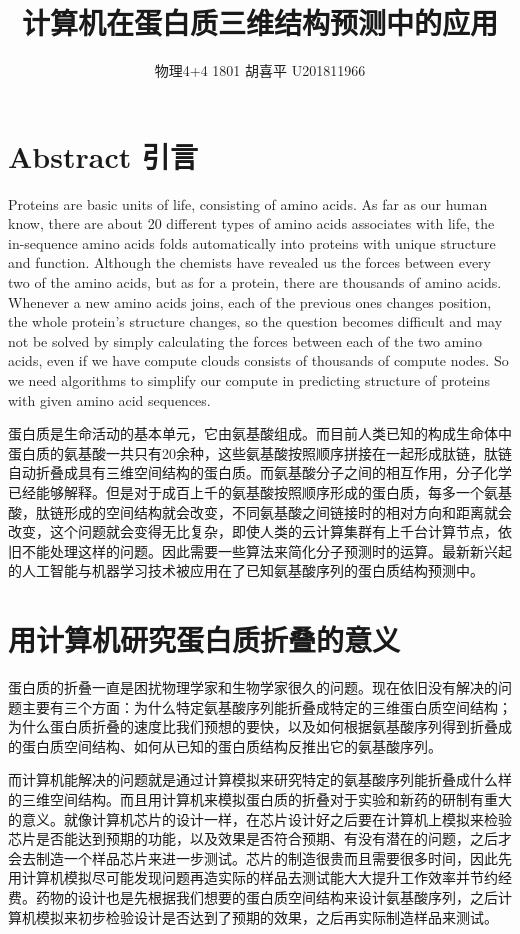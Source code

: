 \documentclass{article}
\author{物理4+4 1801 \quad 胡喜平 \quad U201811966}
\affil{https://hxp.plus/}
\title{计算机在蛋白质三维结构预测中的应用}
\begin{document}
\maketitle

\section{Abstract 引言}

Proteins are basic units of life, consisting of amino acids. As far as our human know, there are about 20 different types of amino acids associates with life, the in-sequence amino acids folds automatically into proteins with unique structure and function. Although the chemists have revealed us the forces between every two of the amino acids, but as for a protein, there are thousands of amino acids. Whenever a new amino acids joins, each of the previous ones changes position, the whole protein's structure changes, so the question becomes difficult and may not be solved by simply calculating the forces between each of the two amino acids, even if we have compute clouds consists of thousands of compute nodes. So we need algorithms to simplify our compute in predicting structure of proteins with given amino acid sequences.

蛋白质是生命活动的基本单元，它由氨基酸组成。而目前人类已知的构成生命体中蛋白质的氨基酸一共只有20余种，这些氨基酸按照顺序拼接在一起形成肽链，肽链自动折叠成具有三维空间结构的蛋白质。而氨基酸分子之间的相互作用，分子化学已经能够解释。但是对于成百上千的氨基酸按照顺序形成的蛋白质，每多一个氨基酸，肽链形成的空间结构就会改变，不同氨基酸之间链接时的相对方向和距离就会改变，这个问题就会变得无比复杂，即使人类的云计算集群有上千台计算节点，依旧不能处理这样的问题。因此需要一些算法来简化分子预测时的运算。最新新兴起的人工智能与机器学习技术被应用在了已知氨基酸序列的蛋白质结构预测中。

\section{用计算机研究蛋白质折叠的意义}

蛋白质的折叠一直是困扰物理学家和生物学家很久的问题。现在依旧没有解决的问题主要有三个方面：为什么特定氨基酸序列能折叠成特定的三维蛋白质空间结构；为什么蛋白质折叠的速度比我们预想的要快，以及如何根据氨基酸序列得到折叠成的蛋白质空间结构、如何从已知的蛋白质结构反推出它的氨基酸序列。

而计算机能解决的问题就是通过计算模拟来研究特定的氨基酸序列能折叠成什么样的三维空间结构。而且用计算机来模拟蛋白质的折叠对于实验和新药的研制有重大的意义。就像计算机芯片的设计一样，在芯片设计好之后要在计算机上模拟来检验芯片是否能达到预期的功能，以及效果是否符合预期、有没有潜在的问题，之后才会去制造一个样品芯片来进一步测试。芯片的制造很贵而且需要很多时间，因此先用计算机模拟尽可能发现问题再造实际的样品去测试能大大提升工作效率并节约经费。药物的设计也是先根据我们想要的蛋白质空间结构来设计氨基酸序列，之后计算机模拟来初步检验设计是否达到了预期的效果，之后再实际制造样品来测试。
\end{document}
